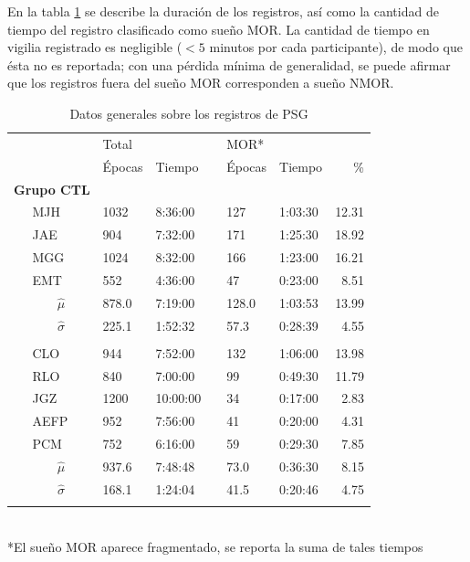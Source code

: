 \documentclass[12pt,letterpaper]{book}
\newcommand{\ppu}{\phantom{1}}
\newcommand{\bordes}[1]{\renewcommand{\arraystretch}{#1}}
\newcommand{\midrulec}{%
  \arrayrulecolor{gris}\specialrule{\aboverulesep}{0pt}{0pt}
  \arrayrulecolor{black}\specialrule{\lightrulewidth}{0pt}{\belowrulesep}
}
\newcommand{\bottomrulec}{%
  \arrayrulecolor{black}
  \arrayrulecolor{gris}\specialrule{\belowrulesep}{0pt}{0pt}
  \arrayrulecolor{black}\specialrule{\lightrulewidth}{0pt}{\belowrulesep}
}
\begin{document}
En la tabla \ref{tab:psg} se describe la duración de los registros, así como la cantidad de tiempo del registro clasificado como sueño MOR.
%
La cantidad de tiempo en vigilia registrado es negligible ($<5$ minutos por cada participante), de modo que ésta no es reportada; con una pérdida mínima de generalidad, se puede afirmar que los registros fuera del sueño MOR corresponden a sueño NMOR.

\begin{table}
\centering
\caption{Datos generales sobre los registros de PSG}
\bordes{1.2}
\begin{tabular}{llllcllr}
\toprule
    \phantom{mmm}&
    & \multicolumn{2}{l}{Total} & \phantom{l}   & \multicolumn{3}{l}{MOR*}\\
    \cmidrule{3-4}  \cmidrule{6-8}
    &          &Épocas  &  Tiempo   &&Épocas  &  Tiempo   &  \% \\
\midrule
\multicolumn{2}{l}{\textbf{Grupo CTL}}\\
&MJH &    1032   &      8:36:00  &&    127   &   1:03:30 &12.31 \\
&JAE &\ppu 904   &      7:32:00  &&    171   &   1:25:30 &18.92 \\
&MGG &    1024   &      8:32:00  &&    166   &   1:23:00 &16.21 \\
&EMT &\ppu 552   &      4:36:00  &&\ppu 47   &   0:23:00 & 8.51 \\
 
\rowcolor{gris}
&\multicolumn{1}{c}{$\widehat{\mu}$}  
     &\ppu 878.0 &      7:19:00 &&    128.0 &   1:03:53&13.99 \\
\rowcolor{gris}
&\multicolumn{1}{c}{$\widehat{\sigma}$} 
     &\ppu 225.1 &      1:52:32 &&\ppu 57.3  &   0:28:39&4.55 \\ 
\midrulec

\multicolumn{2}{l}{\textbf{Grupo PDC}}\\
&CLO  &\ppu 944   &\ppu 7:52:00 &&    132   &   1:06:00 & 13.98 \\
&RLO  &\ppu 840   &\ppu 7:00:00 &&\ppu 99   &   0:49:30 & 11.79 \\
&JGZ  &    1200   &    10:00:00 &&\ppu 34   &   0:17:00 &  2.83 \\
&AEFP &\ppu 952   &\ppu 7:56:00 &&\ppu 41   &   0:20:00 &  4.31 \\
&PCM  &\ppu 752   &\ppu 6:16:00 &&\ppu 59   &   0:29:30 &  7.85 \\
 
\rowcolor{gris}
&\multicolumn{1}{c}{$\widehat{\mu}$}  
      &\ppu 937.6 &\ppu 7:48:48 &&\ppu 73.0 &   0:36:30 & 8.15 \\
\rowcolor{gris}
&\multicolumn{1}{c}{$\widehat{\sigma}$} 
      &\ppu 168.1 &\ppu 1:24:04 &&\ppu 41.5 &   0:20:46 & 4.75 \\
\bottomrulec
\end{tabular}\\
*El sueño MOR aparece fragmentado, se reporta la suma de tales tiempos
\label{tab:psg}
\end{table}
\end{document}
